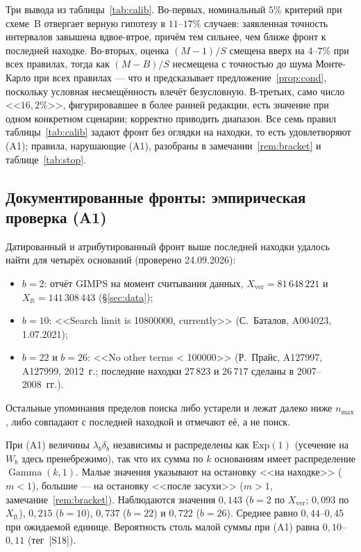 \documentclass[11pt,a4paper]{article}
\theoremstyle{plain}
\theoremstyle{remark}
\DeclareMathOperator{\Gam}{Gamma}
\begin{document}
Три вывода из таблицы~\ref{tab:calib}. Во-первых, номинальный $5\%$ критерий при
схеме~B отвергает верную гипотезу в $11$--$17\%$ случаев: заявленная точность
интервалов завышена вдвое-втрое, причём тем сильнее, чем ближе фронт к последней
находке. Во-вторых, оценка $(M-1)/S$ смещена вверх на $4$--$7\%$ при всех правилах,
тогда как $(M-B)/S$ несмещена с точностью до шума Монте-Карло при всех правилах ---
что и предсказывает предложение~\ref{prop:cond}, поскольку условная несмещённость
влечёт безусловную. В-третьих, само число <<$16{,}2\%$>>, фигурировавшее в более
ранней редакции, есть значение при одном конкретном сценарии; корректно приводить
диапазон. Все семь правил таблицы~\ref{tab:calib} задают фронт без оглядки на
находки, то есть удовлетворяют (A1); правила, нарушающие (A1), разобраны в
замечании~\ref{rem:bracket} и таблице~\ref{tab:stop}.

\subsection{Документированные фронты: эмпирическая проверка (A1)}\label{sec:frontiers}

Датированный и атрибутированный фронт выше последней находки удалось найти для
четырёх оснований (проверено 24.09.2026):
\begin{itemize}
\item $b=2$: отчёт GIMPS на момент считывания данных, $X_{\mathrm{ver}}=81\,648\,221$
и $X_{\mathrm{ft}}=141\,308\,443$ (\S\ref{sec:data});
\item $b=10$: <<Search limit is 10800000, currently>> (С.~Баталов, A004023,
1.07.2021);
\item $b=22$ и $b=26$: <<No other terms < 100000>> (Р.~Прайс, A127997, A127999,
2012~г.; последние находки $27\,823$ и $26\,717$ сделаны в 2007--2008~гг.).
\end{itemize}
Остальные упоминания пределов поиска либо устарели и лежат далеко ниже $n_{\max}$,
либо совпадают с последней находкой и отмечают её, а не поиск.

При (A1) величины $\lambda_b\delta_b$ независимы и распределены как $\mathrm{Exp}(1)$
(усечение на $W_b$ здесь пренебрежимо), так что их сумма по $k$ основаниям имеет
распределение $\Gam(k,1)$. Малые значения указывают на остановку <<на находке>>
($m<1$), большие --- на остановку <<после засухи>> ($m>1$,
замечание~\ref{rem:bracket}). Наблюдаются значения $0{,}143$ ($b=2$ по
$X_{\mathrm{ver}}$; $0{,}093$ по $X_{\mathrm{ft}}$), $0{,}215$ ($b=10$), $0{,}737$
($b=22$) и $0{,}722$ ($b=26$). Среднее равно $0{,}44$--$0{,}45$ при ожидаемой единице.
Вероятность столь малой суммы при (A1) равна $0{,}10$--$0{,}11$ (тег~[S18]).
\end{document}
